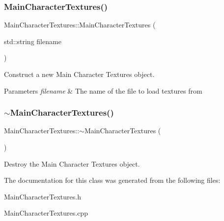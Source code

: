 \subsubsection{\texorpdfstring{MainCharacterTextures()}{MainCharacterTextures()}}
{\footnotesize\ttfamily Main\+Character\+Textures\+::\+Main\+Character\+Textures (\begin{DoxyParamCaption}\item[{std\+::string}]{filename }\end{DoxyParamCaption})}



Construct a new Main Character Textures object. 


\begin{DoxyParams}{Parameters}
{\em filename} & The name of the file to load textures from \\
\hline
\end{DoxyParams}
\mbox{\label{classMainCharacterTextures_a08e0c3b7fcd4e6d79638f8fa14e1eadf}} 
\subsubsection{\texorpdfstring{$\sim$MainCharacterTextures()}{~MainCharacterTextures()}}
{\footnotesize\ttfamily Main\+Character\+Textures\+::$\sim$\+Main\+Character\+Textures (\begin{DoxyParamCaption}{ }\end{DoxyParamCaption})}



Destroy the Main Character Textures object. 



The documentation for this class was generated from the following files\+:\begin{DoxyCompactItemize}
\item 
Main\+Character\+Textures.\+h\item 
Main\+Character\+Textures.\+cpp\end{DoxyCompactItemize}

